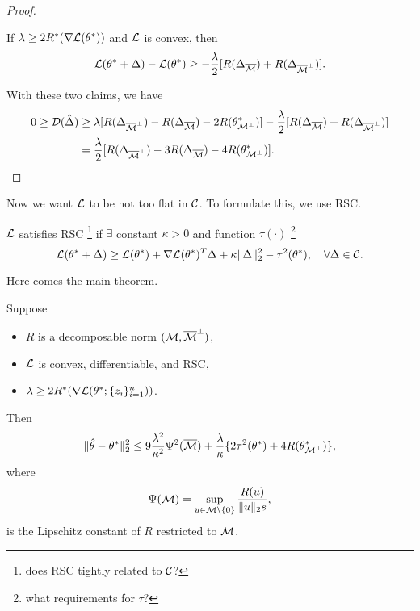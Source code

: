 \begin{proof}
    \begin{claim}
        If $\lambda\ge 2R^*(\nabla\mathcal{L}(\theta^*))$ and $\mathcal{L}$ is convex, then
        \begin{equation}
            \mathcal{L}(\theta^*+\Delta) -\mathcal{L}(\theta^*) \ge -\frac{\lambda}{2} [R(\Delta_{{\overline{\mathcal{M}}}})+R(\Delta_{{\overline{\mathcal{M}}}^\perp})].
        \end{equation}
    \end{claim}

    With these two claims, we have
    \begin{equation}
    \begin{split}
    0 \ge \mathcal{D}({\hat\Delta}) & \ge \lambda[R(\Delta_{{\overline{\mathcal{M}}}^\perp})-R(\Delta_{{\overline{\mathcal{M}}}})-2R(\theta^*_{\mathcal{M}^\perp})]
        -\frac{\lambda}{2}[R(\Delta_{{\overline{\mathcal{M}}}})+R(\Delta_{{\overline{\mathcal{M}}}^\perp})]  \\
    & = \frac{\lambda}{2}[R(\Delta_{{\overline{\mathcal{M}}}^\perp})-3R(\Delta_{{\overline{\mathcal{M}}}})-4R(\theta^*_{\mathcal{M}^\perp})].
    \end{split}
    \end{equation}
\end{proof}

Now we want $\mathcal{L}$ to be not too flat in $\mathcal{C}$.
To formulate this, we use RSC.

\begin{define}
    $\mathcal{L}$ satisfies RSC
    \footnote{does RSC tightly related to $\mathcal{C}$?}
    if $\exists$ constant $\kappa > 0$ and function $\tau(\cdot)$
    \footnote{what requirements for $\tau$?}
    \st
    \begin{equation}
        \mathcal{L}(\theta^*+\Delta)\ge \mathcal{L}(\theta^*) + \nabla \mathcal{L}(\theta^*)^T\Delta + \kappa\|\Delta\|_2^2-\tau^2(\theta^*),\quad \forall \Delta\in\mathcal{C}.
    \end{equation}
\end{define}

Here comes the main theorem.

\begin{thm}
Suppose
\begin{itemize}
    \item $R$ is a decomposable norm \wrt $(\mathcal{M}, {\overline{\mathcal{M}}}^\perp)$,
    \item $\mathcal{L}$ is convex, differentiable, and RSC,
    \item $\lambda\ge 2R^*(\nabla\mathcal{L}(\theta^*;\{z_i\}_{i=1}^n))$.
\end{itemize}
Then
\begin{equation}
    \|{\hat{\theta}}-\theta^*\|_2^2\le 9\frac{\lambda^2}{\kappa^2}\Psi^2({\overline{\mathcal{M}}})
        + \frac{\lambda}{\kappa}\{2\tau^2(\theta^*)+4R(\theta^*_{\mathcal{M}^\perp})\},
\end{equation}
where
\begin{equation}
    \Psi(\mathcal{M})=\sup_{u\in\mathcal{M}\backslash\{0\}}\frac{R(u)}{\|u\|_2s},
\end{equation}
is the Lipschitz constant of $R$ restricted to $\mathcal{M}$.
\end{thm}

